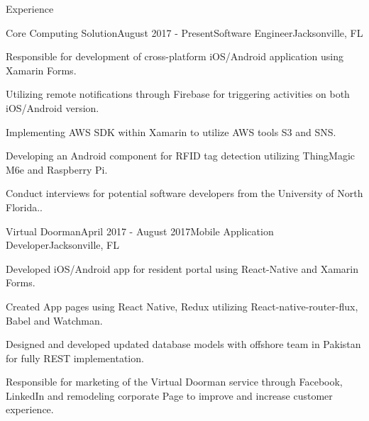 \documentclass{resume} %
\begin{document}
\begin{rSection}{Experience}


\begin{rSubsection}{Core Computing Solution}{August 2017 - Present}{Software Engineer}{Jacksonville, FL}
\item Responsible for development of cross-platform iOS/Android application using Xamarin Forms.
\item Utilizing remote notifications through Firebase for triggering activities on both iOS/Android version.
\item Implementing AWS SDK within Xamarin to utilize AWS tools S3 and SNS.
\item Developing an Android component for RFID tag detection utilizing ThingMagic M6e and Raspberry Pi.
\item Conduct interviews for potential software developers from the University of North Florida..
\end{rSubsection}


\begin{rSubsection}{Virtual Doorman}{April 2017 - August 2017}{Mobile Application Developer}{Jacksonville, FL}
\item Developed iOS/Android app for resident portal using React-Native and Xamarin Forms.
\item Created App pages using React Native, Redux utilizing React-native-router-flux, Babel and Watchman.
\item Designed and developed updated database models with offshore team in Pakistan for fully REST implementation. 
\item Responsible for marketing of the Virtual Doorman service through Facebook, LinkedIn and remodeling corporate Page to improve and increase customer experience.
\end{rSubsection}



\end{rSection}
\end{document}

